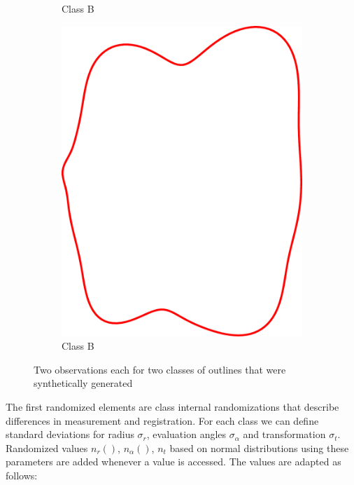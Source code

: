 \documentclass[pdftex,12pt,a4paper]{report}
\begin{document}
\begin{figure}
\begin{subfigure}[b]{0.24\textwidth}
		\caption{Class B}
		\label{subfig:synthetic-classes:b-1}
	\end{subfigure}
	\begin{subfigure}[b]{0.24\textwidth}
		\centering
		\includegraphics[width=.9\linewidth]{img/synthetic-generation/classes/2-2.pdf}
		\caption{Class B}
		\label{subfig:synthetic-classes:b-2}
	\end{subfigure}
	\caption{Two observations each for two classes of outlines that were synthetically generated}
	\label{fig:synthetic-classes}
\end{figure}


The first randomized elements are class internal randomizations that describe differences in measurement and registration. For each class we can define standard deviations for radius $\sigma_r$, evaluation angles $\sigma_\alpha$ and transformation $\sigma_t$. Randomized values $n_r()$, $n_\alpha()$, $n_t$ based on normal distributions using these parameters are added whenever a value is accessed. The values are adapted as follows:
\end{document}
